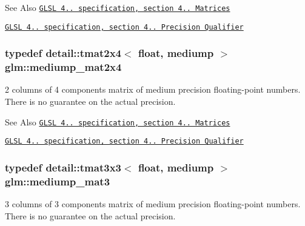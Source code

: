 \begin{DoxySeeAlso}{See Also}
\href{http://www.opengl.org/registry/doc/GLSLangSpec.4.20.8.pdf}{\tt G\-L\-S\-L 4.. specification, section 4.. Matrices} 

\href{http://www.opengl.org/registry/doc/GLSLangSpec.4.20.8.pdf}{\tt G\-L\-S\-L 4.. specification, section 4.. Precision Qualifier} 
\end{DoxySeeAlso}
\hypertarget{group__core__precision_gae90cf4be1ded03a3a5b7b42045da253c}{
\subsubsection[{mediump\-\_\-mat2x4}]{\setlength{\rightskip}{0pt plus 5cm}typedef detail\-::tmat2x4$<$ float, mediump $>$ {\bf glm\-::mediump\-\_\-mat2x4}}}\label{group__core__precision_gae90cf4be1ded03a3a5b7b42045da253c}
2 columns of 4 components matrix of medium precision floating-\/point numbers. There is no guarantee on the actual precision.

\begin{DoxySeeAlso}{See Also}
\href{http://www.opengl.org/registry/doc/GLSLangSpec.4.20.8.pdf}{\tt G\-L\-S\-L 4.. specification, section 4.. Matrices} 

\href{http://www.opengl.org/registry/doc/GLSLangSpec.4.20.8.pdf}{\tt G\-L\-S\-L 4.. specification, section 4.. Precision Qualifier} 
\end{DoxySeeAlso}
\hypertarget{group__core__precision_gacf45e22f1fb2703b181995676963a1f9}{
\subsubsection[{mediump\-\_\-mat3}]{\setlength{\rightskip}{0pt plus 5cm}typedef detail\-::tmat3x3$<$ float, mediump $>$ {\bf glm\-::mediump\-\_\-mat3}}}\label{group__core__precision_gacf45e22f1fb2703b181995676963a1f9}
3 columns of 3 components matrix of medium precision floating-\/point numbers. There is no guarantee on the actual precision.

